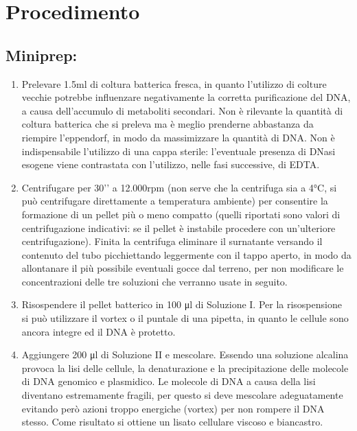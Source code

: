 \section{Procedimento}

\subsection{Miniprep:}

\begin{enumerate}
  \item Prelevare 1.5ml di coltura batterica fresca, in quanto l’utilizzo di colture vecchie potrebbe
	influenzare negativamente la corretta purificazione del DNA, a causa dell’accumulo di metaboliti secondari.
	Non è rilevante la quantità di coltura batterica che si preleva ma \`e meglio prenderne abbastanza da riempire
	l’eppendorf, in modo da massimizzare la quantità di DNA. Non è indispensabile l’utilizzo di una cappa sterile:
	l’eventuale presenza di DNasi esogene viene contrastata con l’utilizzo, nelle fasi successive, di EDTA.
  \item Centrifugare per 30’’ a 12.000rpm (non serve che la centrifuga sia a 4°C, si pu\`o centrifugare direttamente
	a temperatura ambiente) per consentire la formazione di un pellet più o meno
	compatto (quelli riportati sono valori di centrifugazione indicativi: se il pellet è instabile procedere
	con un’ulteriore centrifugazione). Finita la centrifuga eliminare il surnatante versando il contenuto del tubo picchiettando
	leggermente con il tappo aperto, in modo da allontanare il più possibile eventuali gocce dal terreno,
	per non modificare le concentrazioni delle tre soluzioni che verranno usate in seguito.

  \item Risospendere il pellet batterico in 100 μl di Soluzione I. Per la risospensione si può utilizzare il vortex o
	il puntale di una pipetta, in quanto le cellule sono ancora integre ed il DNA è protetto.

  \item Aggiungere 200 μl di Soluzione II e mescolare. Essendo una soluzione alcalina provoca la lisi delle cellule,
	la denaturazione e la  precipitazione delle molecole di DNA genomico e plasmidico.
	Le molecole di DNA a causa della lisi diventano estremamente fragili, per questo si deve mescolare
	adeguatamente evitando per\`o azioni troppo energiche (vortex) per non rompere il DNA stesso.
	Come risultato si ottiene un lisato cellulare viscoso e biancastro.


\end{enumerate}
